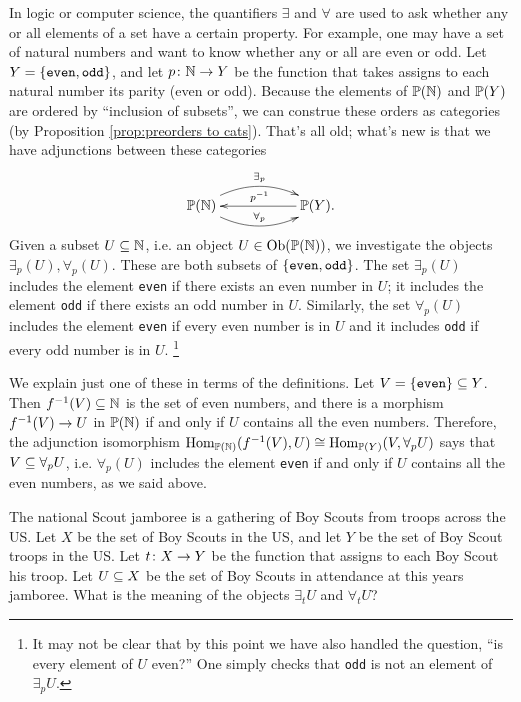 \documentclass[CT4S-EN-RU]{subfiles}
\begin{document}
\begin{example}

In logic or computer science, the quantifiers $\exists$ and $\forall$ are used to ask whether any or all elements of a set have a certain property. For example, one may have a set of natural numbers and want to know whether any or all are even or odd.
Let $Y=\{{\tt even,odd}\}$, and let $p\taking\NN\to Y$ be the function that takes assigns to each natural number its parity (even or odd). Because the elements of $\PP(\NN)$ and $\PP(Y)$ are ordered by “inclusion of subsets”, we can construe these orders as categories (by Proposition \ref{prop:preorders to cats}). That's all old; what's new is that we have adjunctions between these categories
$$
\xymatrix{\PP(\NN)\ar@/^1.2pc/[rr]^{\exists_p}\ar@/_1.2pc/[rr]^{\forall_p}&&\PP(Y)\ar[ll]_{p^\m1}.}
$$
Given a subset $U\ss\NN$, i.e. an object $U\in\Ob(\PP(\NN))$, we investigate the objects $\exists_p(U),\forall_p(U)$. These are both subsets of $\{{\tt even,odd}\}$. The set $\exists_p(U)$ includes the element {\tt even} if there exists an even number in $U$; it includes the element {\tt odd} if there exists an odd number in $U$. Similarly, the set $\forall_p(U)$ includes the element {\tt even} if every even number is in $U$ and it includes {\tt odd} if every odd number is in $U$.
\footnote{It may not be clear that by this point we have also handled the question, “is every element of $U$ even?” One simply checks that {\tt odd} is not an element of $\exists_pU$.}

We explain just one of these in terms of the definitions. Let $V=\{{\tt even}\}\ss Y$. Then $f^\m1(V)\ss\NN$ is the set of even numbers, and there is a morphism $f^\m1(V)\to U$ in $\PP(\NN)$ if and only if $U$ contains all the even numbers. Therefore, the adjunction isomorphism $\Hom_{\PP(\NN)}(f^\m1(V),U)\iso\Hom_{\PP(Y)}(V,\forall_pU)$ says that $V\ss\forall_pU$, i.e. $\forall_p(U)$ includes the element {\tt even} if and only if $U$ contains all the even numbers, as we said above.

\end{example}

\begin{exercise}
The national Scout jamboree is a gathering of Boy Scouts from troops across the US. Let $X$ be the set of Boy Scouts in the US, and let $Y$ be the set of Boy Scout troops in the US. Let $t\taking X\to Y$ be the function that assigns to each Boy Scout his troop. Let $U\ss X$ be the set of Boy Scouts in attendance at this years jamboree. What is the meaning of the objects $\exists_tU$ and $\forall_tU$?
\end{exercise}
\end{document}
